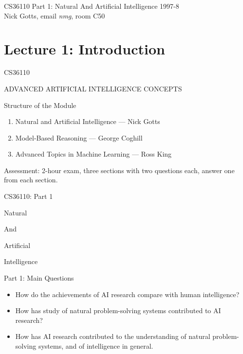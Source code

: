 \documentclass{article}
\begin{document}
{\Large CS36110 Part 1:}
{\Large Natural And Artificial Intelligence}
{\Large 1997-8}\\Nick Gotts, email {\em nmg}, room C50
\section{Lecture 1: Introduction}

\begin{slide}{}
{\Huge CS36110}

\begin{center} 
{\Large ADVANCED}
{\Large ARTIFICIAL INTELLIGENCE}
{\Large CONCEPTS}
\end{center}

{\large Structure of the Module}
\begin{enumerate}
\item
Natural and Artificial Intelligence --- Nick Gotts
\item
Model-Based Reasoning --- George Coghill
\item
Advanced  Topics in Machine Learning --- Ross King
\end{enumerate}
{\Large Assessment:}
2-hour exam, three sections with two questions each, answer one from
each section.
\end{slide}

\begin{slide}{}
\begin{center}
{\Huge CS36110: Part 1}

{\Huge Natural}

{\Huge And}

{\Huge Artificial}

{\Huge Intelligence}
\end{center}
\end{slide}

\begin{slide}{}
{\Large Part 1: Main Questions}

\begin{itemize}
\item How do the achievements of AI research
compare with human intelligence?
\item How has study of natural problem-solving systems contributed to
AI research?
\item How has AI research contributed to the understanding of natural
problem-solving systems, and of intelligence in general.
\end{itemize}
\end{slide}
\end{document}
